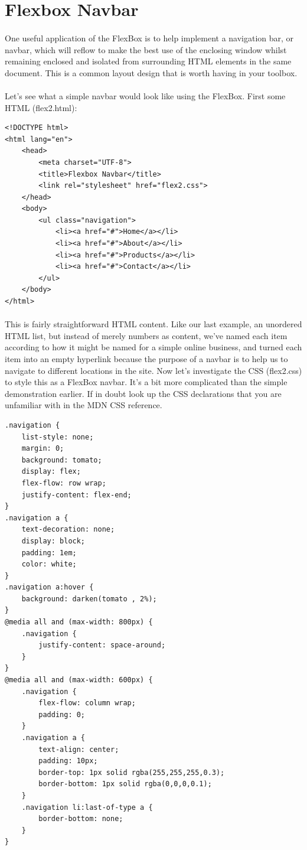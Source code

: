\section{Flexbox Navbar}
\paragraph{} One useful application of the FlexBox is to help implement a navigation bar, or navbar, which will reflow to make the best use of the enclosing window whilst remaining enclosed and isolated from surrounding HTML elements in the same document. This is a common layout design that is worth having in your toolbox.
\paragraph{} Let's see what a simple navbar would look like using the FlexBox. First some HTML (flex2.html):

\begin{lstlisting}
<!DOCTYPE html>
<html lang="en">
	<head>
		<meta charset="UTF-8">
  		<title>Flexbox Navbar</title>
  		<link rel="stylesheet" href="flex2.css">
	</head>
	<body>
		<ul class="navigation">
  			<li><a href="#">Home</a></li>
  			<li><a href="#">About</a></li>
  			<li><a href="#">Products</a></li>
  			<li><a href="#">Contact</a></li>
		</ul>
	</body>
</html>
\end{lstlisting}

\paragraph{} This is fairly straightforward HTML content. Like our last example, an unordered HTML list, but instead of merely numbers as content, we've named each item according to how it might be named for a simple online business, and turned each item into an empty hyperlink because the purpose of a navbar is to help us to navigate to different locations in the site. Now let's investigate the CSS (flex2.css) to style this as a FlexBox navbar. It's a bit more complicated than the simple demonstration earlier. If in doubt look up the CSS declarations that you are unfamiliar with in the MDN CSS reference.



\begin{lstlisting}
.navigation { 
    list-style: none; 
    margin: 0;
    background: tomato; 
    display: flex;
    flex-flow: row wrap;
    justify-content: flex-end;
}
.navigation a { 
    text-decoration: none; 
    display: block; 
    padding: 1em;
    color: white;
}
.navigation a:hover {
    background: darken(tomato , 2%);
}
@media all and (max-width: 800px) { 
    .navigation {
        justify-content: space-around; 
    }
}
@media all and (max-width: 600px) { 
    .navigation {
        flex-flow: column wrap;
        padding: 0; 
    }
    .navigation a {
        text-align: center;
        padding: 10px;
        border-top: 1px solid rgba(255,255,255,0.3); 
        border-bottom: 1px solid rgba(0,0,0,0.1);
    }
    .navigation li:last-of-type a { 
        border-bottom: none;
    } 
}
\end{lstlisting}

